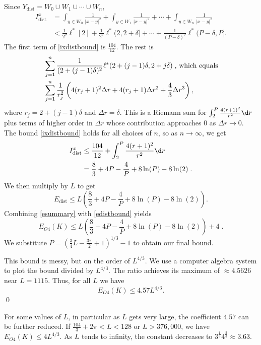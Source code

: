 \documentclass{elsart}
\begin{document}
\begin{pf}
Since $Y_{\mathrm{dist}}=W_0\cup W_1\cup \cdots \cup W_n$,
\begin{align}
I^x_{\mathrm{dist}} &= \int_{y\in W_0}\frac{1}{|x-y|^2} + 
\int_{y\in W_1}\frac{1}{|x-y|^2} + \cdots +
\int_{y\in W_n}\frac{1}{|x-y|^2}\nonumber \\
&< \frac{1}{2^2}\ell^*[2] + \frac{1}{2^2}\ell^*(2,2+\delta]+\cdots
+\frac{1}{(P-\delta)^2}\ell^*(P-\delta,P]\label{ixdistbound}.
\end{align}
The first term of \eqref{ixdistbound} is $\frac{104}{12}$.
The rest is
\begin{align*}
& \sum_{j=1}^n \frac{1}{(2+(j-1)\delta)^2}\ell^*(2+(j-1)\delta,2+j\delta)
\text{\;, which equals}\\
& \sum_{j=1}^n \frac{1}{r_j^2}\left(4(r_j+1)^2\Delta r +
4(r_j+1)\Delta r^2 + \frac{4}{3}\Delta r^3\right),
\end{align*}
where $r_j=2+(j-1)\delta$ and $\Delta r=\delta$.  This
is a Riemann sum for 
$\int_2^P\frac{4(r+1)^2}{r^2}\d r$ plus terms of higher order in $\Delta r$
whose contribution approaches $0$ as $\Delta r\to 0$.  The bound
\eqref{ixdistbound} holds for all choices of $n$, so as
$n\to \infty$, we get  
\begin{align*}
I^x_{\mathrm{dist}} 
&\leq \frac{104}{12}+\int_2^P \frac{4(r+1)^2}{r^2}\d r\\
&= \frac{8}{3}+4P-\frac{4}{P}+8\ln(P)-8\ln(2)\;.
\end{align*}
We then multiply by $L$ to get
\begin{equation}
\label{edistbound}
E_{\mathrm{dist}}\leq L
\left(\frac{8}{3}+4P-\frac{4}{P}+8\ln(P)-8\ln(2)\right).
\end{equation}
Combining \eqref{esummary} with \eqref{edistbound} yields
\begin{equation}
\label{finalbound}
E_{O4}(K)\leq L
\left(\frac{8}{3}+4P-\frac{4}{P}+8\ln(P)-8\ln(2)\right)+4\;.
\end{equation}
We substitute $P=\left(\frac{3}{4}L-\frac{3\pi}{2}+1\right)^{1/3}-1$
to obtain our final bound.

This bound is messy, but on the order of $L^{4/3}$.  We use
a computer algebra system to plot the bound divided by $L^{4/3}$.
The ratio achieves its maximum of $\approx 4.5626$ near $L=1115$.
Thus, for all $L$ we have 
$$E_{O4}(K)\leq 4.57L^{4/3}.$$
\qed
\end{pf}

For some values of $L$, in particular as
$L$ gets very large, the coefficient $4.57$ can be further reduced.
If $\frac{104}{3}+2\pi< L < 128$ or
$L> 376,\!000$,
we have $E_{O4}(K)\leq 4L^{4/3}$.  As $L$ tends to infinity,
the constant decreases to $3^{\frac{1}{3}}4^{\frac{2}{3}}\approx 3.63$.



\end{document}
